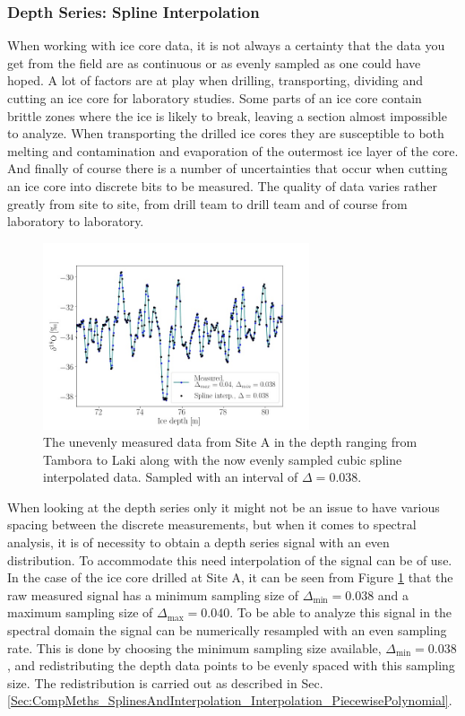 \documentclass[../../CompleteThesis/Complete_1stDraft.tex]{subfiles}
\begin{document}
\subsubsection[Spline Interpolation]{Depth Series: Spline Interpolation}
\label{Subsubsec:Method_FirstSigmaEstimate_BackDiffusion_SplineInterp}
When working with ice core data, it is not always a certainty that the data you get from the field are as continuous or as evenly sampled as one could have hoped. A lot of factors are at play when drilling, transporting, dividing and cutting an ice core for laboratory studies. Some parts of an ice core contain brittle zones where the ice is likely to break, leaving a section almost impossible to analyze. When transporting the drilled ice cores they are susceptible to both melting and contamination and evaporation of the outermost ice layer of the core. And finally of course there is a number of uncertainties that occur when cutting an ice core into discrete bits to be measured. The quality of data varies rather greatly from site to site, from drill team to drill team and of course from laboratory to laboratory. \\
\begin{figure}[h]
	\centering
	\includegraphics[width=0.7\textwidth]{SiteA_d18OLT_Interp.jpg}
	\caption[Measured and interpolated $\delta^{18}$O data, Site A]{The unevenly measured data from Site A in the depth ranging from Tambora to Laki along with the now evenly sampled cubic spline interpolated data. Sampled with an interval of $\Delta = 0.038$.}
	\label{fig:SiteA_d18OLT_Interp}
\end{figure}
When looking at the depth series only it might not be an issue to have various spacing between the discrete measurements, but when it comes to spectral analysis, it is of necessity to obtain a depth series signal with an even distribution. To accommodate this need interpolation of the signal can be of use. In the case of the ice core drilled at Site A, it can be seen from Figure \ref{fig:SiteA_d18OLT_Interp} that the raw measured signal has a minimum sampling size of $\Delta_{\text{min}}=0.038$ and a maximum sampling size of $\Delta_{\text{max}}=0.040$. To be able to analyze this signal in the spectral domain the signal can be numerically resampled with an even sampling rate. This is done by choosing the minimum sampling size available, $\Delta_{\text{min}}=0.038$, and redistributing the depth data points to be evenly spaced with this sampling size. The redistribution is carried out as described in Sec. \ref{Sec:CompMeths_SplinesAndInterpolation_Interpolation_PiecewisePolynomial}.
\end{document}
